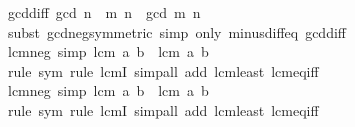 \begin{isabellebody}
\endisatagproof
{\isafoldproof}%
%
\isadelimproof
\isanewline
%
\endisadelimproof
\isanewline
{}\isamarkupfalse%
\ gcd{\isacharunderscore}{\kern0pt}diff{}{\isacharcolon}{\kern0pt}\ {\isachardoublequoteopen}gcd\ {\isacharparenleft}{\kern0pt}n\ {\isacharminus}{\kern0pt}\ m{\isacharparenright}{\kern0pt}\ n\ {\isacharequal}{\kern0pt}\ gcd\ m\ n{\isachardoublequoteclose}\isanewline
%
\isadelimproof
\ \ %
\endisadelimproof
%
\isatagproof
{}\isamarkupfalse%
\ {\isacharparenleft}{\kern0pt}subst\ gcd{\isacharunderscore}{\kern0pt}neg{}{\isacharbrackleft}{\kern0pt}symmetric{\isacharbrackright}{\kern0pt}{\isacharparenright}{\kern0pt}\ {\isacharparenleft}{\kern0pt}simp\ only{\isacharcolon}{\kern0pt}\ minus{\isacharunderscore}{\kern0pt}diff{\isacharunderscore}{\kern0pt}eq\ gcd{\isacharunderscore}{\kern0pt}diff{}{\isacharparenright}{\kern0pt}%
\endisatagproof
{\isafoldproof}%
%
\isadelimproof
\isanewline
%
\endisadelimproof
\isanewline
{}\isamarkupfalse%
\ lcm{\isacharunderscore}{\kern0pt}neg{}\ {\isacharbrackleft}{\kern0pt}simp{\isacharbrackright}{\kern0pt}{\isacharcolon}{\kern0pt}\ {\isachardoublequoteopen}lcm\ {\isacharparenleft}{\kern0pt}{\isacharminus}{\kern0pt}a{\isacharparenright}{\kern0pt}\ b\ {\isacharequal}{\kern0pt}\ lcm\ a\ b{\isachardoublequoteclose}\isanewline
%
\isadelimproof
\ \ %
\endisadelimproof
%
\isatagproof
{}\isamarkupfalse%
\ {\isacharparenleft}{\kern0pt}rule\ sym{\isacharcomma}{\kern0pt}\ rule\ lcmI{\isacharparenright}{\kern0pt}\ {\isacharparenleft}{\kern0pt}simp{\isacharunderscore}{\kern0pt}all\ add{\isacharcolon}{\kern0pt}\ lcm{\isacharunderscore}{\kern0pt}least\ lcm{\isacharunderscore}{\kern0pt}eq{\isacharunderscore}{\kern0pt}{}{\isacharunderscore}{\kern0pt}iff{\isacharparenright}{\kern0pt}%
\endisatagproof
{\isafoldproof}%
%
\isadelimproof
\isanewline
%
\endisadelimproof
\isanewline
{}\isamarkupfalse%
\ lcm{\isacharunderscore}{\kern0pt}neg{}\ {\isacharbrackleft}{\kern0pt}simp{\isacharbrackright}{\kern0pt}{\isacharcolon}{\kern0pt}\ {\isachardoublequoteopen}lcm\ a\ {\isacharparenleft}{\kern0pt}{\isacharminus}{\kern0pt}b{\isacharparenright}{\kern0pt}\ {\isacharequal}{\kern0pt}\ lcm\ a\ b{\isachardoublequoteclose}\isanewline
%
\isadelimproof
\ \ %
\endisadelimproof
%
\isatagproof
{}\isamarkupfalse%
\ {\isacharparenleft}{\kern0pt}rule\ sym{\isacharcomma}{\kern0pt}\ rule\ lcmI{\isacharparenright}{\kern0pt}\ {\isacharparenleft}{\kern0pt}simp{\isacharunderscore}{\kern0pt}all\ add{\isacharcolon}{\kern0pt}\ lcm{\isacharunderscore}{\kern0pt}least\ lcm{\isacharunderscore}{\kern0pt}eq{\isacharunderscore}{\kern0pt}{}{\isacharunderscore}{\kern0pt}iff{\isacharparenright}{\kern0pt}%

\end{isabellebody}
